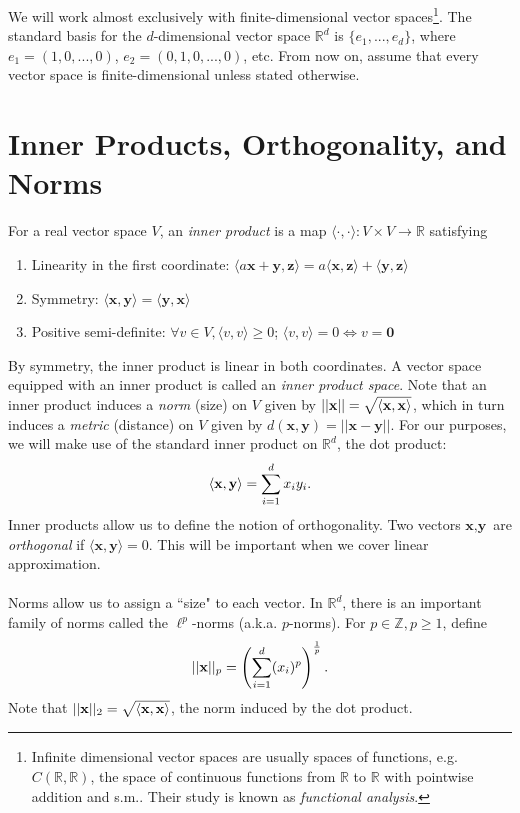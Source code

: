 \documentclass{article}
\newcommand{\R}{\mathbb{R}}
\newcommand{\Z}{\mathbb{Z}}
\newcommand{\la}{\langle}
\newcommand{\ra}{\rangle}
\newcommand{\tit}{\textit}
\newcommand{\tbf}{\textbf}
\begin{document}
We will work almost exclusively with finite-dimensional vector spaces\footnote{Infinite dimensional vector spaces are usually spaces of functions, e.g. $C(\R, \R)$, the space of continuous functions from $\R$ to $\R$ with pointwise addition and s.m.. Their study is known as \tit{functional analysis}.}. The standard basis for the $d$-dimensional vector space $\R^d$ is $\{e_1, ... , e_d\}$, where $e_1 = (1,0,...,0)$, $e_2 = (0,1,0,...,0)$, etc.  From now on, assume that every vector space is finite-dimensional unless stated otherwise.

\section{Inner Products, Orthogonality, and Norms}
For a real vector space $V$, an \tit{inner product} is a map $\la \cdot, \cdot \ra: V \times V \to \mathbb{R}$ satisfying 
\begin{enumerate}[label = (\alph*)]
\item Linearity in the first coordinate: $\la a\tbf{x} + \tbf{y}, \tbf{z} \ra = a\la \tbf{x},\tbf{z}\ra + \la \tbf{y}, \tbf{z} \ra$
\item Symmetry: $\la \tbf{x},\tbf{y}\ra = \la \tbf{y},\tbf{x}\ra$
\item Positive semi-definite: $\forall v \in V, \la v, v \ra \geq 0$; $\la v, v \ra = 0 \iff v = \mathbf{0}$
\end{enumerate}
By symmetry, the inner product is linear in both coordinates. A vector space equipped with an inner product is called an \tit{inner product space}. Note that an inner product induces a \tit{norm} (size) on $V$ given by $||\tbf{x}|| = \sqrt{\langle \bold{x},  \bold{x}\rangle}$, which in turn induces a \tit{metric} (distance) on $V$ given by $d(\tbf{x},\tbf{y}) = ||\tbf{x} - \tbf{y}||$. For our purposes, we will make use of the standard inner product on $\mathbb{R}^d$, the dot product: 
$$ \langle \bold{x},  \bold{y}\rangle = \sum_{i=1}^d x_iy_i.$$ 
Inner products allow us to define the notion of orthogonality. Two vectors $\tbf{x}, \tbf{y}$ are \tit{orthogonal} if $\la \tbf{x}, \tbf{y} \ra = 0$. This will be important when we cover linear approximation.
\\ \\
Norms allow us to assign a ``size" to each vector. In $\R^d$, there is an important family of norms called the $\ell^p$-norms (a.k.a. $p$-norms). For $p \in \Z, p \geq 1$, define 
$$||\bold{x}||_p = \left(\sum_{i = 1}^d (x_i)^p\right)^\frac{1}{p}.$$
Note that $||\bold{x}||_2 = \sqrt{\langle \bold{x},  \bold{x}\rangle}$, the norm induced by the dot product.
\end{document}
